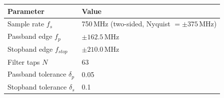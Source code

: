 \begin{tabular}{ll}
  \toprule
  Parameter & Value \\
  \midrule
  Sample rate $f_s$ & 750\,MHz (two-sided, Nyquist $= \pm375$\,MHz) \\
  Passband edge $f_p$ & $\pm162.5$\,MHz \\
  Stopband edge $f_{stop}$ & $\pm210.0$\,MHz \\
  Filter taps $N$ & 63 \\
  Passband tolerance $\delta_p$ & 0.05 \\
  Stopband tolerance $\delta_s$ & 0.1 \\
  \bottomrule
\end{tabular}
